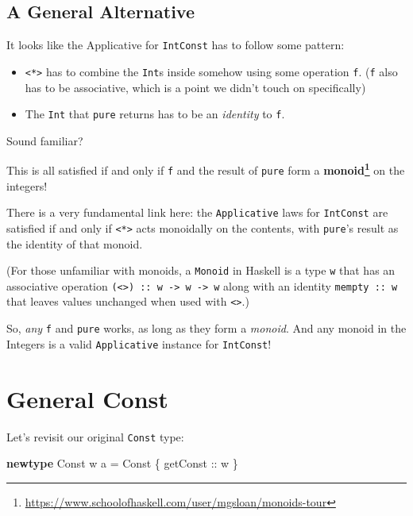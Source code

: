 \documentclass[]{article}
\newenvironment{Shaded}{}{}
\newcommand{\DataTypeTok}[1]{\textcolor[rgb]{0.56,0.13,0.00}{#1}}
\newcommand{\FunctionTok}[1]{\textcolor[rgb]{0.02,0.16,0.49}{#1}}
\newcommand{\KeywordTok}[1]{\textcolor[rgb]{0.00,0.44,0.13}{\textbf{#1}}}
\newcommand{\NormalTok}[1]{#1}
\newcommand{\OtherTok}[1]{\textcolor[rgb]{0.00,0.44,0.13}{#1}}
\renewcommand{\href}[2]{#2\footnote{\url{#1}}}
\begin{document}
\hypertarget{a-general-alternative}{%
\subsection{A General Alternative}\label{a-general-alternative}}

It looks like the Applicative for \texttt{IntConst} has to follow some pattern:

\begin{itemize}
\tightlist
\item
  \texttt{\textless{}*\textgreater{}} has to combine the \texttt{Int}s inside
  somehow using some operation \texttt{f}. (\texttt{f} also has to be
  associative, which is a point we didn't touch on specifically)
\item
  The \texttt{Int} that \texttt{pure} returns has to be an \emph{identity} to
  \texttt{f}.
\end{itemize}

Sound familiar?

This is all satisfied if and only if \texttt{f} and the result of \texttt{pure}
form a
\textbf{\href{https://www.schoolofhaskell.com/user/mgsloan/monoids-tour}{monoid}}
on the integers!

There is a very fundamental link here: the \texttt{Applicative} laws for
\texttt{IntConst} are satisfied if and only if
\texttt{\textless{}*\textgreater{}} acts monoidally on the contents, with
\texttt{pure}'s result as the identity of that monoid.

(For those unfamiliar with monoids, a \texttt{Monoid} in Haskell is a type
\texttt{w} that has an associative operation
\texttt{(\textless{}\textgreater{})\ ::\ w\ -\textgreater{}\ w\ -\textgreater{}\ w}
along with an identity \texttt{mempty\ ::\ w} that leaves values unchanged when
used with \texttt{\textless{}\textgreater{}}.)

So, \emph{any} \texttt{f} and \texttt{pure} works, as long as they form a
\emph{monoid}. And any monoid in the Integers is a valid \texttt{Applicative}
instance for \texttt{IntConst}!

\hypertarget{general-const}{%
\section{General Const}\label{general-const}}

Let's revisit our original \texttt{Const} type:

\begin{Shaded}
\begin{Highlighting}[]
\KeywordTok{newtype} \DataTypeTok{Const}\NormalTok{ w a }\FunctionTok{=} \DataTypeTok{Const}\NormalTok{ \{}\OtherTok{ getConst ::}\NormalTok{ w \}}
\end{Highlighting}
\end{Shaded}
\end{document}
